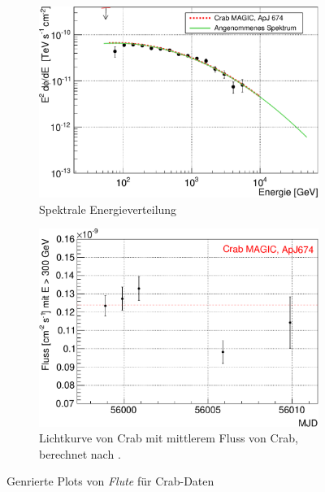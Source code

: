 \begin{figure}
\begin{subfigure}{0.45\linewidth}
  \end{subfigure}
  \hfill
  \begin{subfigure}{0.45\linewidth}
  \includegraphics[width=\textwidth]{./Plots/04_MrkAnalyse/Datenset2/Crab_SED.pdf}
  \caption{Spektrale Energieverteilung}
  \label{Datenset2_SED_Crab}
  \end{subfigure}
  \hfill
  \begin{subfigure}{0.45\linewidth}
  \includegraphics[width=\textwidth]{./Plots/04_MrkAnalyse/Datenset2/Crab_LC.pdf}
  \caption{Lichtkurve von Crab mit mittlerem Fluss von Crab, berechnet nach \cite{LiteraturreferenzMAGIC}.}
  \label{Datenset2_LC_Crab}
  \end{subfigure}
  \hfill
\caption{Genrierte Plots von \textit{Flute} für Crab-Daten}
\label{Datenset2_Flute_Plots_Crab}
\end{figure}

